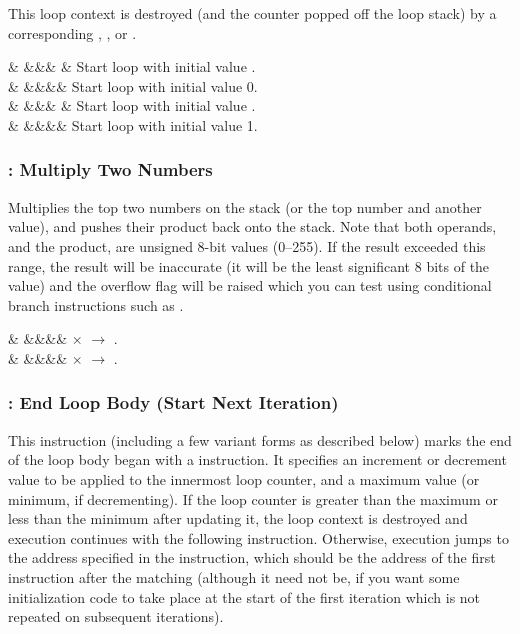 \documentclass[letterpaper,twoside,onecolumn,openright,final]{memoir}
\begin{document}
{This loop context is destroyed (and the counter popped off the loop stack) by a corresponding
, , or .

\begin{opdesc}
   &            &&&\z{\$} & Start loop with initial value .\\
   &            &&&& Start loop with initial value 0.\\
   &    &&&\z{\#} & Start loop with initial value .\\
   &            &&&& Start loop with initial value 1.\\
\end{opdesc}

\subsubsection{: Multiply Two Numbers}
Multiplies the top two numbers on the stack (or the top number and another value), 
and pushes their product back onto the 
stack.  Note that both operands, and the product, are unsigned 8-bit values (0--255).
If the result exceeded this range, the result will be inaccurate (it will be the least
significant 8 bits of the value) and the overflow flag will be raised which you can test
using conditional branch instructions such as .

\begin{opdesc}
   &            &&&\z{\$,\$}&  $\times$  $\rightarrow$ .\\
   &    &&&\z{\$,\#}&  $\times$  $\rightarrow$ .\\
\end{opdesc}

\subsubsection{: End Loop Body (Start Next Iteration)}
This instruction (including a few variant forms as described below) marks the end of the loop
body began with a  instruction.  It specifies an increment or decrement value to be
applied to the innermost loop counter, and a maximum value (or minimum, if decrementing).
If the loop counter is greater than the maximum or less than the minimum after updating it,
the loop context is destroyed and execution continues with the following instruction.
Otherwise, execution jumps to the address specified in the  instruction, which should
be the address of the first instruction after the matching  (although it need not be,
if you want some initialization code to take place at the start of the first iteration which
is not repeated on subsequent iterations).

}
\end{document}
